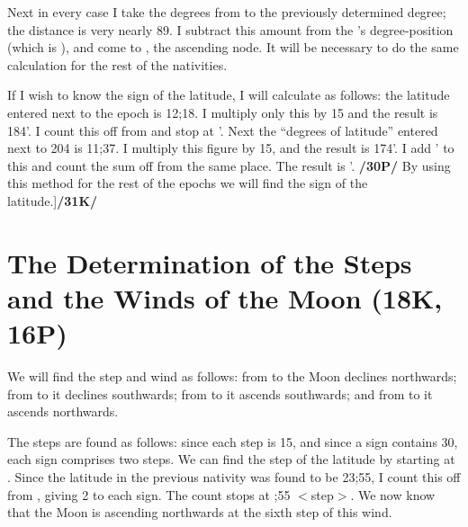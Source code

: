 Next in every case I take the degrees from \Taurus\xspace to the previously determined degree; the distance is very nearly 89\deg. I subtract this amount from the \Moon’s degree-position (which is \Scorpio\xspace 7\deg), and come to \Leo\xspace 8\deg, the ascending node. It will be necessary to do the same calculation for the rest of the nativities.

If I wish to know the sign of the latitude, I will calculate as follows: the latitude entered next to the epoch is 12;18. I multiply only this by 15\deg\xspace and the result is 184\deg\xspace 30'. I count this off from \Leo\xspace and stop
at \deg\xspace 30'. Next the “degrees of latitude” entered next to 204 is 11;37. I multiply this figure by
15\deg, and the result is 174\deg\xspace 15'. I add \Aquarius\xspace 4\deg\xspace 30' to this and count the sum off from the same place. The result is \deg\xspace 45'. \textbf{/30P/} By using this method for the rest of the epochs we will find the sign of the latitude.]\textbf{/31K/}

\newpage
\section{The Determination of the Steps and the Winds of the Moon (18K, 16P)}
We will find the step and wind as follows: from \Leo\xspace to \Libra\xspace the Moon declines northwards; from \Scorpio\xspace to \Capricorn\xspace it declines southwards; from \Aquarius\xspace to \Aries\xspace it ascends southwards; and from \Taurus\xspace to \Cancer\xspace it ascends northwards.

The steps are found as follows: since each step is 15\deg, and since a sign contains 30\deg, each sign comprises two steps. We can find the step of the latitude by starting at \Leo. Since the latitude in the previous nativity was found to be 23;55, I count this off from \Leo, giving 2 to each sign. The count stops at \Cancer\xspace 1;55 $<$step$>$. We now know that the Moon is ascending northwards at the sixth step of this wind.

\newpage